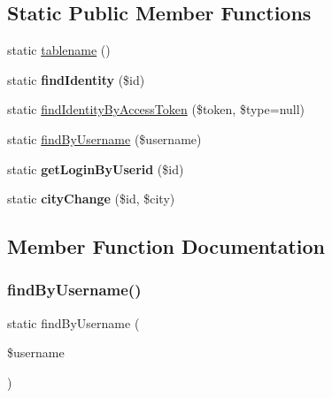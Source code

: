 \subsection*{Static Public Member Functions}
\begin{DoxyCompactItemize}
\item 
static \hyperlink{classapp_1_1models_1_1_user_aa538c6278f56cff99f77d33cd6cb6981}{tablename} ()
\item 
\hypertarget{classapp_1_1models_1_1_user_a1c92c569609f0bcd1c10354de203c3b1}{}\label{classapp_1_1models_1_1_user_a1c92c569609f0bcd1c10354de203c3b1} 
static {\bfseries find\+Identity} (\$id)
\item 
static \hyperlink{classapp_1_1models_1_1_user_a38e0c72af43ac43dc7b789b796c27319}{find\+Identity\+By\+Access\+Token} (\$token, \$type=null)
\item 
static \hyperlink{classapp_1_1models_1_1_user_a168855925aeb48abecf006aff998fa52}{find\+By\+Username} (\$username)
\item 
\hypertarget{classapp_1_1models_1_1_user_a7f3bfa9dce7ff8fe55dc6cd84aec1d3e}{}\label{classapp_1_1models_1_1_user_a7f3bfa9dce7ff8fe55dc6cd84aec1d3e} 
static {\bfseries get\+Login\+By\+Userid} (\$id)
\item 
\hypertarget{classapp_1_1models_1_1_user_a8bb21f88e8a853e6b87733e38310515b}{}\label{classapp_1_1models_1_1_user_a8bb21f88e8a853e6b87733e38310515b} 
static {\bfseries city\+Change} (\$id, \$city)
\end{DoxyCompactItemize}


\subsection{Member Function Documentation}
\hypertarget{classapp_1_1models_1_1_user_a168855925aeb48abecf006aff998fa52}{}\label{classapp_1_1models_1_1_user_a168855925aeb48abecf006aff998fa52} 
\subsubsection{\texorpdfstring{find\+By\+Username()}{findByUsername()}}
{\footnotesize\ttfamily static find\+By\+Username (\begin{DoxyParamCaption}\item[{}]{\$username }\end{DoxyParamCaption})\hspace{0.3cm}{\ttfamily [static]}}

